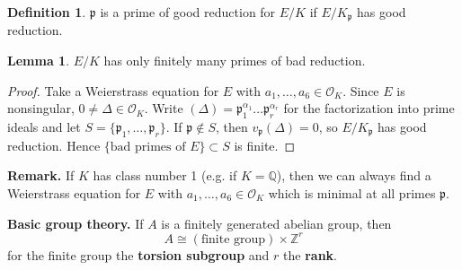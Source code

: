 \documentclass{article}
\theoremstyle{definition}
\newtheorem{lemma}[theorem]{Lemma}
\newtheorem{defn}{Definition}[section]
\begin{document}
\begin{defn}
    $\mathfrak{p}$ is a prime of good reduction for $E/K$ if $E/K_{\mathfrak{p}}$ has good reduction.
\end{defn}
\begin{lemma}\label{lemma10.1}
    $E/K$ has only finitely many primes of bad reduction.
\end{lemma}
\begin{proof}
    Take a Weierstrass equation for $E$ with $a_1,\ldots,a_6 \in \mathcal{O}_K$. Since $E$ is nonsingular, $0 \neq \Delta \in \mathcal{O}_K$. Write $(\Delta)=\mathfrak{p}_1^{\alpha_1}\ldots \mathfrak{p}_r^{\alpha_r}$ for the factorization into prime ideals and let $S = \{\mathfrak{p}_1,\ldots,\mathfrak{p}_r\}$. If $\mathfrak{p} \not\in S$, then $v_{\mathfrak{p}}(\Delta)=0$, so $E/K_{\mathfrak{p}}$ has good reduction. Hence $\{\text{bad primes of }E\}\subset S$ is finite.
\end{proof}
\textbf{Remark.} If $K$ has class number 1 (e.g. if $K=\mathbb{Q}$), then we can always find a Weierstrass equation for $E$ with $a_1,\ldots,a_6 \in \mathcal{O}_K$ which is minimal at all primes $\mathfrak{p}$.
\vspace{1mm}
 
\textbf{Basic group theory.} If $A$ is a finitely generated abelian group, then $$A \cong (\text{finite group}) \times \mathbb{Z}^r$$ for the finite group the \textbf{torsion subgroup} and $r$ the \textbf{rank}. 
\end{document}
